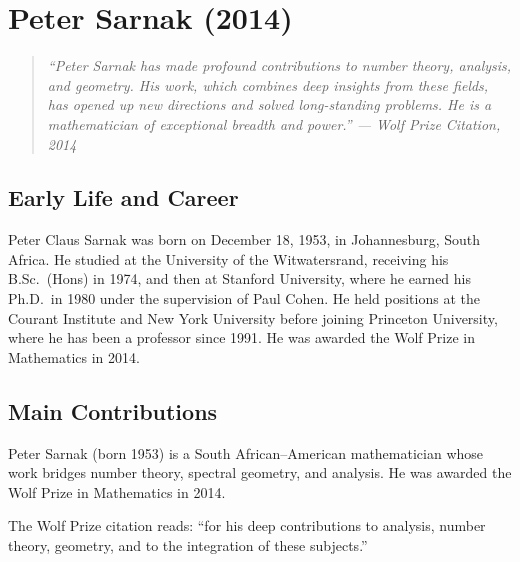 
\let\HH\relax
\newcommand{\HH}{\mathbb{H}}

\chapter{Peter Sarnak (2014)}

\begin{quote}
\it ``Peter Sarnak has made profound contributions to number theory, analysis, and geometry. His work, which combines deep insights from these fields, has opened up new directions and solved long-standing problems. He is a mathematician of exceptional breadth and power.'' --- Wolf Prize Citation, 2014
\end{quote}

\section{Early Life and Career}

Peter Claus Sarnak was born on December 18, 1953, in Johannesburg, South Africa. He studied at the University of the Witwatersrand, receiving his B.Sc.\ (Hons) in 1974, and then at Stanford University, where he earned his Ph.D.\ in 1980 under the supervision of Paul Cohen. He held positions at the Courant Institute and New York University before joining Princeton University, where he has been a professor since 1991. He was awarded the Wolf Prize in Mathematics in 2014.

\section{Main Contributions}

Peter Sarnak (born 1953) is a South African--American mathematician whose work bridges number theory, spectral geometry, and analysis. He was awarded the Wolf Prize in Mathematics in 2014.

The Wolf Prize citation reads: ``for his deep contributions to analysis, number theory, geometry, and to the integration of these subjects.''

